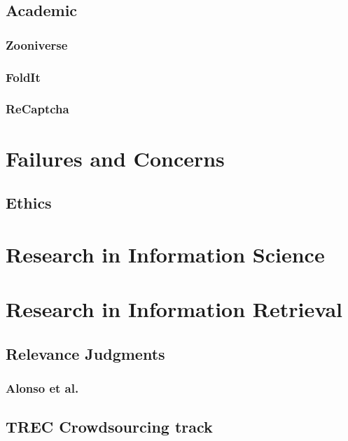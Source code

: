 \subsection{Academic}\label{academic}

\subsubsection{Zooniverse}\label{zooniverse}

\subsubsection{FoldIt}\label{foldit}

\subsubsection{ReCaptcha}\label{recaptcha}

\section{Failures and Concerns}\label{failures-and-concerns}

\subsection{Ethics}\label{ethics}

\section{Research in Information
Science}\label{research-in-information-science}

\section{Research in Information
Retrieval}\label{research-in-information-retrieval}

\subsection{Relevance Judgments}\label{relevance-judgments}

\subsubsection{Alonso et al.}\label{alonso-et-al.}

\subsection{TREC Crowdsourcing track}\label{trec-crowdsourcing-track}

